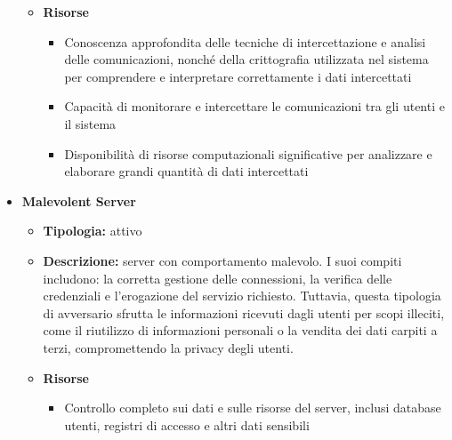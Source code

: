 \begin{itemize}
\begin{itemize}
                    \item \textbf{Risorse}
                        \begin{itemize}
                            \item Conoscenza approfondita delle tecniche di intercettazione e analisi delle comunicazioni, nonché della crittografia utilizzata nel sistema per comprendere e interpretare correttamente i dati intercettati
    
                            \vspace{3mm}
    
                            \item Capacità di monitorare e intercettare le comunicazioni tra gli utenti e il sistema
    
                            \vspace{3mm}
    
                            \item Disponibilità di risorse computazionali significative per analizzare e elaborare grandi quantità di dati intercettati
                        \end{itemize}
                \end{itemize}
    
            \item \textbf{Malevolent Server}
                \begin{itemize}
                    \item \textbf{Tipologia:} attivo
                    
                    \item \textbf{Descrizione:} server con comportamento malevolo.
                    I suoi compiti includono: la corretta gestione delle connessioni, la verifica delle credenziali e l'erogazione del servizio richiesto.
                    Tuttavia, questa tipologia di avversario sfrutta le informazioni ricevuti dagli utenti per scopi illeciti, come il riutilizzo di informazioni personali o la vendita dei dati carpiti a terzi, compromettendo la privacy degli utenti.
                    
                    \item \textbf{Risorse}
                        \begin{itemize}
                            \item Controllo completo sui dati e sulle risorse del server, inclusi database utenti, registri di accesso e altri dati sensibili
    

\end{itemize}
\end{itemize}
\end{itemize}
